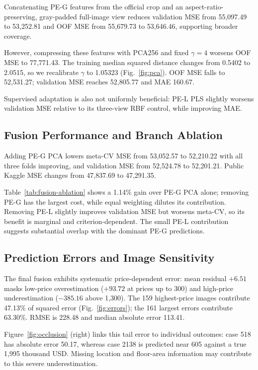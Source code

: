 \documentclass[conference,a4paper]{IEEEtran}
\begin{document}
Concatenating PE-G features from the official crop and an aspect-ratio-preserving, gray-padded full-image view reduces validation MSE from 55,097.49 to 53,252.81 and OOF MSE from 55,679.73 to 53,646.46, supporting broader coverage.

However, compressing these features with PCA256 and fixed $\gamma=4$ worsens OOF MSE to 77,771.43. The training median squared distance changes from 0.5402 to 2.0515, so we recalibrate $\gamma$ to 1.05323 (Fig.~\ref{fig:pca}). OOF MSE falls to 52,531.27; validation MSE reaches 52,805.77 and MAE 160.67.

Supervised adaptation is also not uniformly beneficial: PE-L PLS slightly worsens validation MSE relative to its three-view RBF control, while improving MAE.

\subsection{Fusion Performance and Branch Ablation}
Adding PE-G PCA lowers meta-CV MSE from 53,052.57 to 52,210.22 with all three folds improving, and validation MSE from 52,524.78 to 52,201.21. Public Kaggle MSE changes from 47,837.69 to 47,291.35.

Table~\ref{tab:fusion-ablation} shows a 1.14\% gain over PE-G PCA alone; removing PE-G has the largest cost, while equal weighting dilutes its contribution. Removing PE-L slightly improves validation MSE but worsens meta-CV, so its benefit is marginal and criterion-dependent. The small PE-L contribution suggests substantial overlap with the dominant PE-G predictions.

\subsection{Prediction Errors and Image Sensitivity}
The final fusion exhibits systematic price-dependent error: mean residual $+6.51$ masks low-price overestimation ($+93.72$ at prices up to 300) and high-price underestimation ($-385.16$ above 1,300). The 159 highest-price images contribute 47.13\% of squared error (Fig.~\ref{fig:errors}); the 161 largest errors contribute 63.30\%. RMSE is 228.48 and median absolute error 113.41.


Figure~\ref{fig:occlusion} (right) links this tail error to individual outcomes: case 518 has absolute error 50.17, whereas case 2138 is predicted near 605 against a true 1,995 thousand USD. Missing location and floor-area information may contribute to this severe underestimation.
\end{document}
